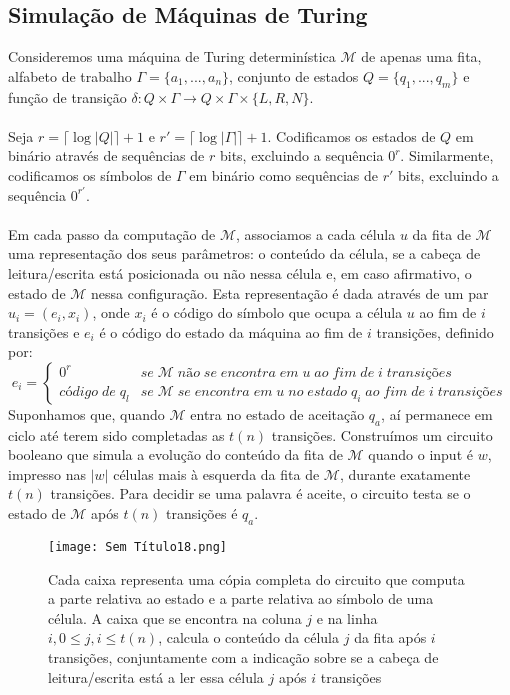 \documentclass[10pt,a4paper]{report}
\begin{document}
\subsection{Simulação de Máquinas de Turing}
Consideremos uma máquina de Turing determinística $\mathcal{M}$ de apenas uma fita, alfabeto de trabalho $\Gamma = \{a_1, ..., a_n\}$, conjunto de estados $Q = \{q_1, ..., q_m\}$ e função de transição $\delta: Q \times \Gamma \rightarrow Q \times \Gamma \times \{L, R, N\}$.\\
\\
Seja $r = \lceil \log |Q| \rceil + 1$ e $r' = \lceil \log |\Gamma| \rceil + 1$. Codificamos os estados de $Q$ em binário através de sequências de $r$ bits, excluindo a sequência $0^r$. Similarmente, codificamos os símbolos de $\Gamma$ em binário como sequências de $r'$ bits, excluindo a sequência $0^{r'}$.\\
\\
Em cada passo da computação de $\mathcal{M}$, associamos a cada célula $u$ da fita de $\mathcal{M}$ uma representação dos seus parâmetros: o conteúdo da célula, se a cabeça de leitura/escrita está posicionada ou não nessa célula e, em caso afirmativo, o estado de $\mathcal{M}$ nessa configuração. Esta representação é dada através de um par $u_i = (e_i, x_i)$, onde $x_i$ é o código do símbolo que ocupa a célula $u$ ao fim de $i$ transições e $e_i$ é o código do estado da máquina ao fim de $i$ transições, definido por:
\[ 
e_i = \left\{
\begin{array}{ll}
      0^r &se \; \mathcal{M} \; não \; se \; encontra \; em \; u \; ao \; fim \; de \; i \; transições\\
      código \; de \; q_l &se \; \mathcal{M} \; se \; encontra \; em \; u \; no \; estado \; q_i \; ao \; fim \; de \; i \; transições
\end{array} 
\right. 
\]
Suponhamos que, quando $\mathcal{M}$ entra no estado de aceitação $q_a$, aí permanece em ciclo até terem sido completadas as $t(n)$ transições. Construímos um circuito booleano que simula a evolução do conteúdo da fita de $\mathcal{M}$ quando o input é $w$, impresso nas $|w|$ células mais à esquerda da fita de $\mathcal{M}$, durante exatamente $t(n)$ transições. Para decidir se uma palavra é aceite, o circuito testa se o estado de $\mathcal{M}$ após $t(n)$ transições é $q_a$.
\begin{figure}[H]
\centering
\texttt{[image: Sem Título18.png]}
\caption{Cada caixa representa uma cópia completa do circuito que computa a parte relativa ao estado e a parte relativa ao símbolo de uma célula. A caixa que se encontra na coluna $j$ e na linha $i, 0 \leq j, i \leq t(n)$, calcula o conteúdo da célula $j$ da fita após $i$ transições, conjuntamente com a indicação sobre se a cabeça de leitura/escrita está a ler essa célula $j$ após $i$ transições}
\end{figure}
\end{document}
